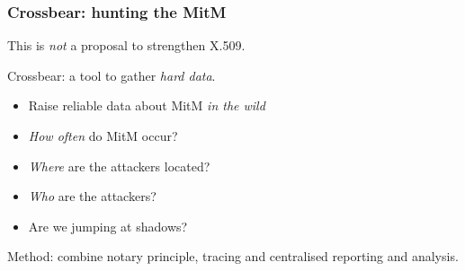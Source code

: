 



\begin{frame}
\frametitle{Crossbear: hunting the MitM}
\begin{block}{This is \textit{not} a proposal to strengthen X.509.}\end{block}
\begin{block}{Crossbear: a tool to gather \textit{hard data}.}
  \begin{itemize}
    \item Raise reliable data about MitM \textit{in the wild}
    \item \textit{How often} do MitM occur?
    \item \textit{Where} are the attackers located?
    \item \textit{Who} are the attackers?
    \item Are we jumping at shadows?
  \end{itemize}
\end{block}
\begin{block}{Method: combine notary principle, tracing and centralised reporting and analysis.}\end{block}
\end{frame}
